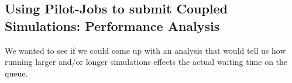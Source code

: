 \documentclass[conference,final]{IEEEtran}
\newcommand{\jhanote}[1]{ {\textcolor{red} { ***Jha: #1 }}}
\newcommand{\jhanote}[1]{}
\begin{document}

\subsection{Using Pilot-Jobs to submit Coupled Simulations:
  Performance Analysis}
  



We wanted to see if we could come up with an analysis that would tell
us how running larger and/or longer simulations effects the actual
waiting time on the queue.

\end{document}
